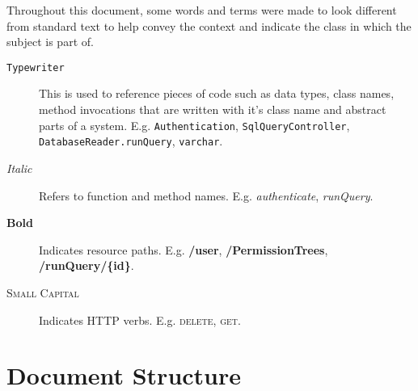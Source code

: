 Throughout this document, some words and terms were made to look different from standard text to help convey the context and indicate the class in which the subject is part of. 

\begin{description}
\item[\texttt{Typewriter}] This is used to reference pieces of code such as data types, class names, method invocations that are written with it's class name and abstract parts of a system. E.g. \texttt{Authentication}, \texttt{SqlQueryController}, \texttt{DatabaseReader.runQuery}, \texttt{varchar}.
\item[\textit{Italic}] Refers to function and method names. E.g. \textit{authenticate}, \textit{runQuery}.
\item[\textbf{Bold}] Indicates resource paths. E.g. \textbf{/user}, \textbf{/PermissionTrees}, \textbf{/runQuery/\{id\}}.
\item[\textsc{Small Capital}] Indicates HTTP verbs. E.g. \textsc{delete}, \textsc{get}.
\end{description}

\section{Document Structure}




